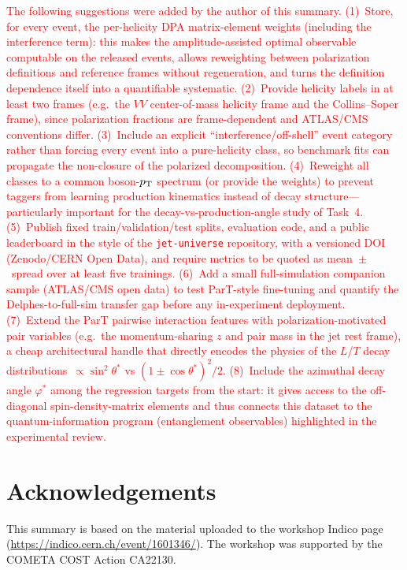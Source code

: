 \textcolor{red}{%
The following suggestions were added by the author of this summary.
(1)~Store, for every event, the per-helicity DPA matrix-element weights
(including the interference term): this makes the amplitude-assisted optimal
observable computable on the released events, allows reweighting between
polarization definitions and reference frames without regeneration, and turns
the definition dependence itself into a quantifiable systematic.
(2)~Provide helicity labels in at least two frames (e.g.\ the $VV$
center-of-mass helicity frame and the Collins--Soper frame), since polarization
fractions are frame-dependent and ATLAS/CMS conventions differ.
(3)~Include an explicit ``interference/off-shell'' event category rather than
forcing every event into a pure-helicity class, so benchmark fits can propagate
the non-closure of the polarized decomposition.
(4)~Reweight all classes to a common boson-$p_{\mathrm{T}}$ spectrum (or provide the
weights) to prevent taggers from learning production kinematics instead of
decay structure---particularly important for the decay-vs-production-angle
study of Task~4.
(5)~Publish fixed train/validation/test splits, evaluation code, and a public
leaderboard in the style of the \texttt{jet-universe} repository, with a
versioned DOI (Zenodo/CERN Open Data), and require metrics to be quoted as
mean~$\pm$~spread over at least five trainings.
(6)~Add a small full-simulation companion sample (ATLAS/CMS open data) to test
ParT-style fine-tuning and quantify the Delphes-to-full-sim transfer gap before
any in-experiment deployment.
(7)~Extend the ParT pairwise interaction features with polarization-motivated
pair variables (e.g.\ the momentum-sharing $z$ and pair mass in the jet rest
frame), a cheap architectural handle that directly encodes the physics of the
$L$/$T$ decay distributions~$\propto\sin^2\theta^{*}$ vs
$(1\pm\cos\theta^{*})^2/2$.
(8)~Include the azimuthal decay angle $\varphi^{*}$ among the regression
targets from the start: it gives access to the off-diagonal spin-density-matrix
elements and thus connects this dataset to the quantum-information program
(entanglement observables) highlighted in the experimental review.}

\section*{Acknowledgements}
This summary is based on the material uploaded to the workshop Indico page
(\url{https://indico.cern.ch/event/1601346/}). The workshop was supported by
the COMETA COST Action CA22130.
